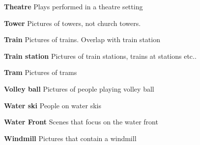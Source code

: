 \noindent\textbf{Theatre}
Plays performed in a theatre setting

\noindent\textbf{Tower}
Pictures of towers, not church towers. 

\noindent\textbf{Train}
Pictures of trains. Overlap with train station


\noindent\textbf{Train station}
Pictures of train stations, trains at stations etc..

\noindent\textbf{Tram}
Pictures of trams

\noindent\textbf{Volley ball}
Pictures of people playing volley ball


\noindent\textbf{Water ski}
People on water skis

\noindent\textbf{Water Front}
Scenes that focus on the water front

\noindent\textbf{Windmill}
Pictures that contain a windmill
